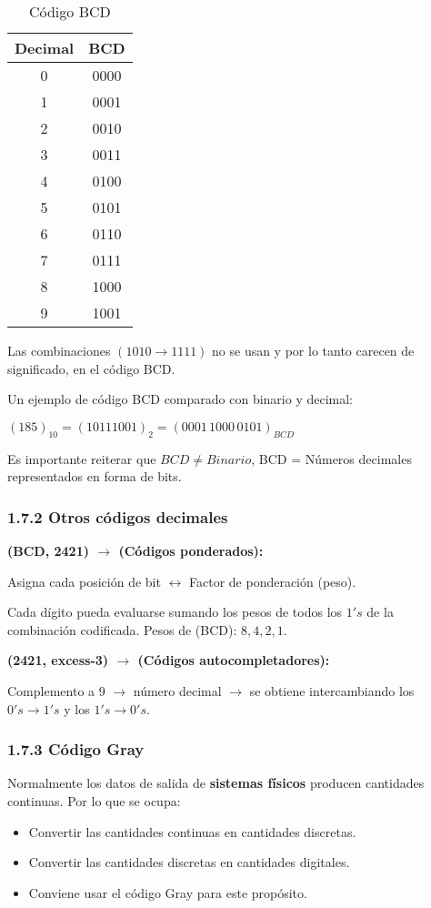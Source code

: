 \begin{table}[h] \centering \begin{tabular}{cc} \toprule Decimal & BCD  \\
               \midrule 0            & 0000 \\ 1 & 0001 \\ 2 & 0010 \\ 3 & 0011 \\ 4 & 0100 \\ 5 & 0101 \\
               6                     & 0110 \\ 7 & 0111 \\ 8 & 1000 \\ 9 & 1001 \\ \bottomrule\end{tabular}
    \caption{C\'{o}digo BCD} \label{tab:code_bcd} \end{table}

Las combinaciones $(1010 \rightarrow 1111)$ no se usan y por lo tanto carecen
de significado, en el c\'{o}digo BCD.

Un ejemplo de c\'{o}digo BCD comparado con binario y decimal: \begin{center}
    $(185)_{10} = (10111001)_{2} = (0001\,1000\,0101)_{BCD}$ \end{center}

Es importante reiterar que $BCD \neq Binario$, BCD = N\'{u}meros decimales
representados en forma de bits.

\subsubsection*{1.7.2 Otros c\'{o}digos decimales}

\textbf{(BCD, 2421) $\rightarrow$ (C\'{o}digos ponderados):} \medbreak

Asigna cada posici\'{o}n de bit $\leftrightarrow$ Factor de ponderaci\'{on}
(peso).

Cada d\'{i}gito pueda evaluarse sumando los pesos de todos los $1's$ de la
combinaci\'{o}n codificada. Pesos de (BCD): $8, 4, 2, 1$. \medbreak

\textbf{(2421, excess-3) $\rightarrow$ (C\'{o}digos autocompletadores):}

Complemento a 9 $\rightarrow$ n\'{u}mero decimal $\rightarrow$ se obtiene
intercambiando los $0's \rightarrow 1's$ y los $1's \rightarrow 0's$. \medbreak

\subsubsection*{1.7.3 C\'{o}digo Gray} Normalmente los datos de salida de
\textbf{sistemas f\'{i}sicos} producen cantidades continuas. Por lo que se ocupa:
\begin{itemize} \small \item Convertir las cantidades continuas en cantidades
          discretas. \item Convertir las cantidades discretas en cantidades digitales.
    \item Conviene usar el c\'{o}digo Gray para este prop\'{o}sito. \end{itemize}
\medbreak

